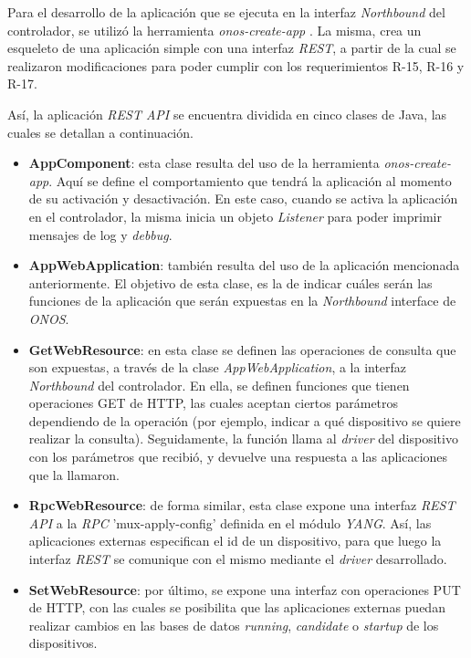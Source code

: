   Para el desarrollo de la aplicación que se ejecuta en la interfaz \textit{Northbound} del controlador, se utilizó la herramienta \textit{onos-create-app} \parencite{onosapptemplate}. La misma, crea un esqueleto de una aplicación simple con una interfaz \textit{REST}, a partir de la cual se realizaron modificaciones para poder cumplir con los requerimientos R-15, R-16 y R-17.

  Así, la aplicación \textit{REST API} se encuentra dividida en cinco clases de Java, las cuales se detallan a continuación. 


  \begin{itemize}
	\item \textbf{AppComponent}: esta clase resulta del uso de la herramienta \textit{onos-create-app}. Aquí se define el comportamiento que tendrá la aplicación al momento de su activación y desactivación. En este caso, cuando se activa la aplicación en el controlador, la misma inicia un objeto \textit{Listener} para poder imprimir mensajes de log y \textit{debbug}.
    
    \item \textbf{AppWebApplication}: también resulta del uso de la aplicación mencionada anteriormente. El objetivo de esta clase, es la de indicar cuáles serán las funciones de la aplicación que serán expuestas en la \textit{Northbound} interface de \textit{ONOS}.

    \item \textbf{GetWebResource}: en esta clase se definen las operaciones de consulta que son expuestas, a través de la clase \textit{AppWebApplication}, a la interfaz \textit{Northbound} del controlador. En ella, se definen funciones que tienen operaciones GET de HTTP, las cuales aceptan ciertos parámetros dependiendo de la operación (por ejemplo, indicar a qué dispositivo se quiere realizar la consulta). Seguidamente, la función llama al \textit{driver} del dispositivo con los parámetros que recibió,  y devuelve una respuesta a las aplicaciones que la llamaron.
    
    \item \textbf{RpcWebResource}: de forma similar, esta clase expone una interfaz \textit{REST API} a la \textit{RPC} 'mux-apply-config' definida en el módulo \textit{YANG}. Así, las aplicaciones externas especifican el id de un dispositivo, para que luego la interfaz \textit{REST} se comunique con el mismo mediante el \textit{driver} desarrollado. 
    
    \item \textbf{SetWebResource}: por último, se expone una interfaz con operaciones PUT de HTTP, con las cuales se posibilita que las aplicaciones externas puedan realizar cambios en las bases de datos \textit{running}, \textit{candidate} o \textit{startup} de los dispositivos.

\end{itemize}

